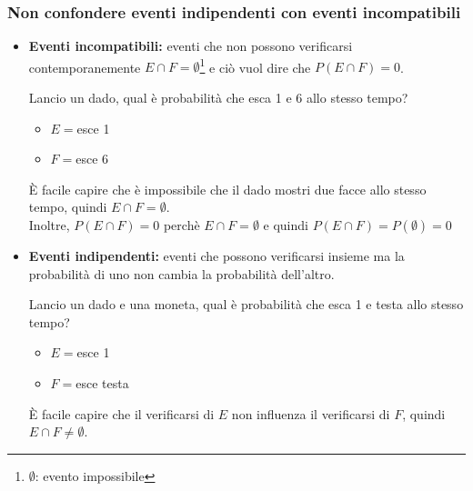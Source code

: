 \documentclass{article}  %
\theoremstyle{definition}
\begin{document}
\subsubsection{Non confondere eventi indipendenti con eventi incompatibili}
\begin{osservazioni}
	\begin{itemize}
		\item \textbf{Eventi incompatibili:} eventi che non possono verificarsi contemporanemente $E \cap F = \emptyset$\footnote{$\emptyset$: evento impossibile} e ciò vuol dire che $P(E \cap F)=0$.
		      \begin{esempio}
			      Lancio un dado, qual è probabilità che esca 1 e 6 allo stesso tempo?
			      \begin{itemize}
				      \item $E=$esce 1
				      \item $F=$esce 6
			      \end{itemize}
			      È facile capire che è impossibile che il dado mostri due facce allo stesso tempo, quindi $E \cap F = \emptyset$.
			      \\ Inoltre, $P(E \cap F)=0$ perchè $E \cap F = \emptyset$ e quindi $P(E \cap F)=P(\emptyset)=0$
		      \end{esempio}
		\item \textbf{Eventi indipendenti:} eventi che possono verificarsi insieme ma la probabilità di uno non cambia la probabilità dell'altro.
		      \begin{esempio}
			      Lancio un dado e una moneta, qual è probabilità che esca 1 e testa allo stesso tempo?
			      \begin{itemize}
				      \item $E=$esce 1
				      \item $F=$esce testa
			      \end{itemize}
			      È facile capire che il verificarsi di $E$ non influenza il verificarsi di $F$, quindi $E \cap F \neq \emptyset$.
		      \end{esempio}
	\end{itemize}
\end{osservazioni}
\end{document}

